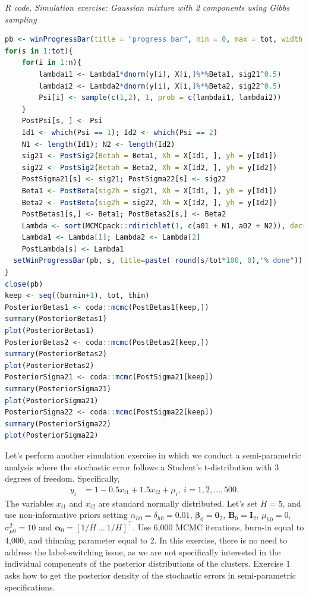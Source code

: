 \begin{tcolorbox}[enhanced,width=4.67in,center upper,
	fontupper=\large\bfseries,drop shadow southwest,sharp corners]
	\textit{R code. Simulation exercise: Gaussian mixture with 2 components using Gibbs sampling}
	\begin{VF}
		\begin{lstlisting}[language=R]
pb <- winProgressBar(title = "progress bar", min = 0, max = tot, width = 300)
for(s in 1:tot){
	for(i in 1:n){
		lambdai1 <- Lambda1*dnorm(y[i], X[i,]%*%Beta1, sig21^0.5)
		lambdai2 <- Lambda2*dnorm(y[i], X[i,]%*%Beta2, sig22^0.5)
		Psi[i] <- sample(c(1,2), 1, prob = c(lambdai1, lambdai2))
	}
	PostPsi[s, ] <- Psi
	Id1 <- which(Psi == 1); Id2 <- which(Psi == 2)
	N1 <- length(Id1); N2 <- length(Id2)
	sig21 <- PostSig2(Betah = Beta1, Xh = X[Id1, ], yh = y[Id1])
	sig22 <- PostSig2(Betah = Beta2, Xh = X[Id2, ], yh = y[Id2])
	PostSigma21[s] <- sig21; PostSigma22[s] <- sig22
	Beta1 <- PostBeta(sig2h = sig21, Xh = X[Id1, ], yh = y[Id1])
	Beta2 <- PostBeta(sig2h = sig22, Xh = X[Id2, ], yh = y[Id2])
	PostBetas1[s,] <- Beta1; PostBetas2[s,] <- Beta2
	Lambda <- sort(MCMCpack::rdirichlet(1, c(a01 + N1, a02 + N2)), decreasing = TRUE)
	Lambda1 <- Lambda[1]; Lambda2 <- Lambda[2]
	PostLambda[s] <- Lambda1 
  setWinProgressBar(pb, s, title=paste( round(s/tot*100, 0),"% done"))
}
close(pb)
keep <- seq((burnin+1), tot, thin)
PosteriorBetas1 <- coda::mcmc(PostBetas1[keep,])
summary(PosteriorBetas1)
plot(PosteriorBetas1)
PosteriorBetas2 <- coda::mcmc(PostBetas2[keep,])
summary(PosteriorBetas2)
plot(PosteriorBetas2)
PosteriorSigma21 <- coda::mcmc(PostSigma21[keep])
summary(PosteriorSigma21)
plot(PosteriorSigma21)
PosteriorSigma22 <- coda::mcmc(PostSigma22[keep])
summary(PosteriorSigma22)
plot(PosteriorSigma22)
\end{lstlisting}
	\end{VF}
\end{tcolorbox}

Let's perform another simulation exercise in which we conduct a semi-parametric analysis where the stochastic error follows a Student's t-distribution with 3 degrees of freedom. Specifically,  
\begin{align*}
	y_i &= 1 - 0.5x_{i1} + 1.5x_{i2} + \mu_i, \ i=1,2,\dots,500.
\end{align*}
The variables $x_{i1}$ and $x_{i2}$ are standard normally distributed. Let's set $H=5$, and use non-informative priors setting $\alpha_{h0}=\delta_{h0}=0.01$, $\boldsymbol{\beta}_0=\boldsymbol{0}_2$, $\boldsymbol{B}_0=\boldsymbol{I}_2$, $\mu_{h0}=0$, $\sigma^2_{\mu 0}=10$ and $\boldsymbol{\alpha}_0=[1/H \ \dots \ 1/H]^{\top}$. Use 6,000 MCMC iterations, burn-in equal to 4,000, and thinning parameter equal to 2. In this exercise, there is no need to address the label-switching issue, as we are not specifically interested in the individual components of the posterior distributions of the clusters. Exercise 1 asks how to get the posterior density of the stochastic errors in semi-parametric specifications. 

